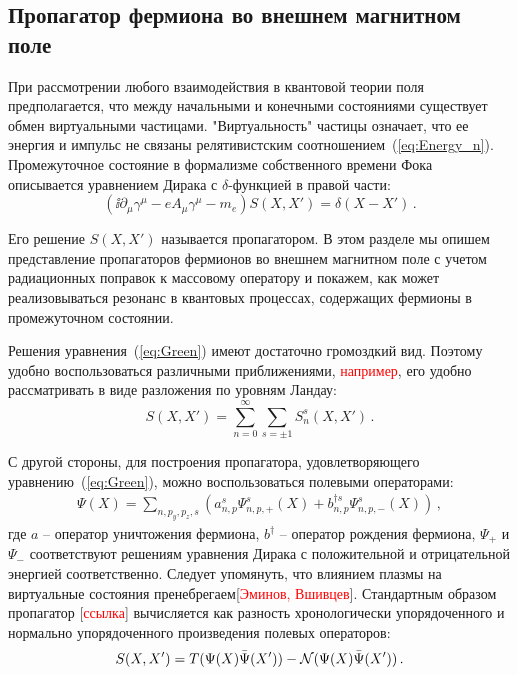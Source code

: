 \subsection{Пропагатор фермиона во внешнем магнитном поле}
При рассмотрении любого взаимодействия в квантовой теории поля предполагается, что между начальными и конечными состояниями существует обмен виртуальными частицами. "Виртуальность" частицы означает, что ее энергия и импульс не связаны релятивистским соотношением~(\ref{eq:Energy_n}). Промежуточное состояние в формализме собственного времени Фока~\cite{Schwinger:1951} описывается уравнением Дирака с $\delta$-функцией в правой части:
%
\begin{equation}\label{eq:Green}
(\ii\partial_\mu \gamma^\mu -e A_\mu \gamma^\mu - m_e) S(X,X')=\delta\left(X-X'\right)\, .
\end{equation}
%

Его решение $S(X,X')$ называется пропагатором. В этом разделе мы опишем представление пропагаторов фермионов во внешнем магнитном поле с учетом радиационных поправок к массовому оператору и покажем, как может реализовываться резонанс в квантовых процессах, содержащих фермионы в промежуточном состоянии.

Решения уравнения~(\ref{eq:Green}) имеют достаточно громоздкий вид. Поэтому удобно воспользоваться различными приближениями, \textcolor{red}{например}, его удобно рассматривать в виде разложения по уровням Ландау:
\begin{equation}
	S(X,X') = \sum_{n=0}^{\infty}\sum_{s=\pm 1} S_n^s (X,X')\, .
\end{equation}

С другой стороны, для построения пропагатора, удовлетворяющего уравнению~(\ref{eq:Green}), можно воспользоваться полевыми операторами:
%
\begin{eqnarray}
\Psi (X) = \sum\limits_{n,p_y,p_z,s} ( a^{s}_{n,p} \Psi_{n,p,+}^s (X) + b^{\dagger s}_{n,p} \Psi_{n,p,-}^s (X) )\,,
\end{eqnarray}
\noindent где $a$ -- оператор уничтожения фермиона, $b^{\dagger}$ -- оператор рождения фермиона, $\Psi_{+}$ и $\Psi_{-}$ соответствуют решениям уравнения Дирака с положительной и отрицательной энергией соответственно. Следует упомянуть, что влиянием плазмы на виртуальные состояния пренебрегаем[\textcolor{red}{Эминов, Вшивцев}]. Стандартным образом пропагатор [\textcolor{red}{ссылка}] вычисляется как разность хронологически упорядоченного и нормально упорядоченного произведения полевых операторов:%
%
\begin{equation}
S(X,X') = T(\Psi(X)\bar{\Psi}(X')) - {\cal N}(\Psi(X)\bar{\Psi}(X'))\, .
\end{equation}
%


